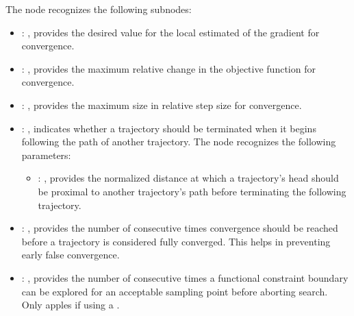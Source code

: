 \begin{itemize}
      The  node recognizes the following subnodes:
      \begin{itemize}
        \item {}: ,
          provides the desired value for the local estimated of the gradient
          for convergence. 

        \item {}: ,
          provides the maximum relative change in the objective function for convergence.

        \item {}: ,
          provides the maximum size in relative step size for convergence.

        \item {}: ,
          indicates whether a trajectory should be terminated when it begins following the path
          of another trajectory.
          The  node recognizes the following parameters:
            \begin{itemize}
              \item {}: ,
                provides the normalized distance at which a trajectory's head should be proximal to
                another trajectory's path before terminating the following trajectory.
          \end{itemize}

        \item {}: ,
          provides the number of consecutive times convergence should be reached before a trajectory
          is considered fully converged. This helps in preventing early false convergence.

        \item {}: ,
          provides the number of consecutive times a functional constraint boundary can be explored
          for an acceptable sampling point before aborting search. Only apples if using a
          . 
      \end{itemize}


\end{itemize}
